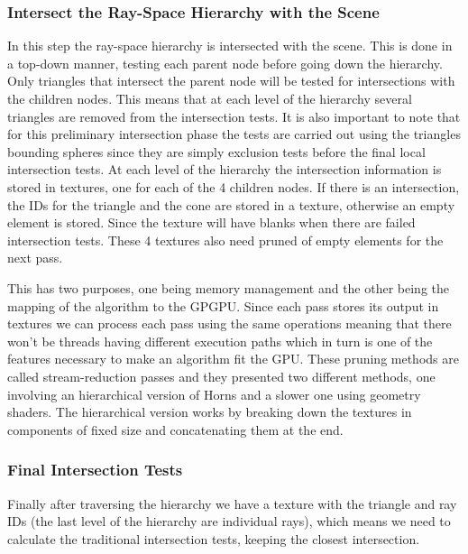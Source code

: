 \subsubsection{Intersect the Ray-Space Hierarchy with the Scene}

In this step the ray-space hierarchy is intersected with the scene. This is done in a top-down manner, testing each parent node before going down the hierarchy. Only triangles that intersect the parent node will be tested for intersections with the children nodes. This means that at each level of the hierarchy several triangles are removed from the intersection tests. It is also important to note that for this preliminary intersection phase the tests are carried out using the triangles bounding spheres since they are simply exclusion tests before the final local intersection tests. At each level of the hierarchy the intersection information is stored in textures, one for each of the 4 children nodes. If there is an intersection, the IDs for the triangle and the cone are stored in a texture, otherwise an empty element is stored. Since the texture will have blanks when there are failed intersection tests. These 4 textures also need pruned of empty elements  for the next pass.

\medskip

This has two purposes, one being memory management and the other being the mapping of the algorithm to the GPGPU. Since each pass stores its output in textures we can process each pass using the same operations meaning that there won't be threads having different execution paths which in turn is one of the features necessary to make an algorithm fit the GPU. These pruning methods are called stream-reduction passes and they presented two different methods, one involving an hierarchical version of Horns \cite{GPUGems2} and a slower one using geometry shaders. The hierarchical version works by breaking down the textures in components of fixed size and concatenating them at the end.

\subsubsection{Final Intersection Tests}	

Finally after traversing the hierarchy we have a texture with the triangle and  ray IDs (the last level of the hierarchy are individual rays), which means we need to calculate the traditional intersection tests, keeping the closest intersection.

